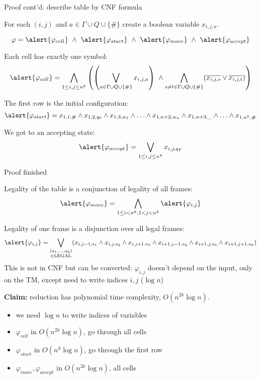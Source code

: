 \documentclass[handout]{beamer}
\begin{document}
\begin{frame}{Proof cont'd: describe table by CNF formula}

    For each $(i,j) $ and $a\in \Gamma\cup Q \cup \{\#\}$ create a boolean variable $x_{i,j,a}$.

    \vspace{-18pt}
    $$
    \varphi=\alert{\varphi_{cell}}\ \wedge\ \alert{\varphi_{start}}\ \wedge\ \alert{\varphi_{move}}\ \wedge\  \alert{\varphi_{accept}}
    $$

    Each cell has exactly one symbol:
    $$
    \alert{\varphi_{cell}}=
        \bigwedge_{1\leq i,j \leq n^k} \left(
            \left(
                \bigvee_{a \in \Gamma\cup Q \cup \{\#\}} x_{i,j,a}
                \right) 
            \ \wedge \bigwedge_{s\neq t\in \Gamma\cup Q \cup \{\#\}} (\overline{x_{i,j,s}}\vee \overline{x_{i,j,t}})
        \right)
    $$

    The first row is the initial configuration:
    $$
    \alert{\varphi_{start}}= x_{1,1,\#}\mathbin{\wedge} x_{1,2,q_0} \mathbin{\wedge} x_{1,3,w_1}\mathbin{\wedge}\ldots \mathbin{\wedge} x_{1,n+2,w_n}\mathbin{\wedge} x_{1,n+3,\_}\mathbin{\wedge}\ldots \mathbin{\wedge} x_{1,n^k,\#}
    $$

    We got to an accepting state:
    $$
    \alert{\varphi_{accept}}= \bigvee_{1\leq i,j \leq n^k} x_{i,j,q_{F}}
    $$    

\end{frame}


\begin{frame}{Proof finished}

    \vspace{-3pt}
    Legality of the table is a conjunction of legality of all frames:
    $$
    \alert{\varphi_{move}}=\bigwedge_{1\leq i < n^k, 1<j<n^k} \alert{\varphi_{i,j}}
    $$

    \vspace{-3pt}
    Legality of one frame is a disjunction over all legal frames:
    $$
    \alert{\varphi_{i,j}}=\bigvee_{\substack{(a_1,\ldots,a_6) \\ \in\mathrm{LEGAL}}}(x_{i,j-1,a_1}\mathbin{\wedge} x_{i,j,a_2}\mathbin{\wedge} x_{i,j+1,a_3}\mathbin{\wedge}x_{i+1,j-1,a_4}\mathbin{\wedge} x_{i+1,j,a_5}\mathbin{\wedge} x_{i+1,j+1,a_6})
    $$
    This is not in CNF but can be converted: $\varphi_{i,j}$ doesn't depend on the  input, only on the TM, except need to write indices $i,j$ ($\log n$)

    \textbf{Claim:} reduction has polynomial time complexity, $O(n^{2k}\log n)$.
    \begin{itemize}
        \item we need $\log n$ to write indices of variables
        \item $\varphi_{cell}$ in $O(n^{2k}\log n)$, go through all cells
        \item $\varphi_{start}$ in $O(n^{k}\log n)$, go through the first row
        \item $\varphi_{move},\varphi_{accept}$ in $O(n^{2k}\log n)$, all cells
        \hfill\qedsymbol
    \end{itemize}

\end{frame}
\end{document}

